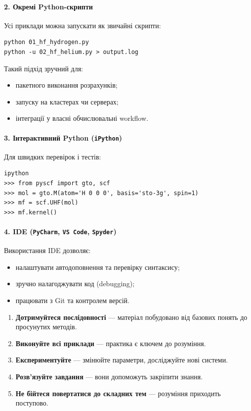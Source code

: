 \paragraph{2. Окремі Python-скрипти}

Усі приклади можна запускати як звичайні скрипти:
\begin{verbatim}
python 01_hf_hydrogen.py
python -u 02_hf_helium.py > output.log
\end{verbatim}

Такий підхід зручний для:
\begin{itemize}
    \item пакетного виконання розрахунків;
    \item запуску на кластерах чи серверах;
    \item інтеграції у власні обчислювальні workflow.
\end{itemize}

\paragraph{3. Інтерактивний Python (\texttt{iPython})}

Для швидких перевірок і тестів:
\begin{verbatim}
ipython
>>> from pyscf import gto, scf
>>> mol = gto.M(atom='H 0 0 0', basis='sto-3g', spin=1)
>>> mf = scf.UHF(mol)
>>> mf.kernel()
\end{verbatim}

\paragraph{4. IDE (\texttt{PyCharm}, \texttt{VS Code}, \texttt{Spyder})}

Використання IDE дозволяє:
\begin{itemize}
    \item налаштувати автодоповнення та перевірку синтаксису;
    \item зручно налагоджувати код (debugging);
    \item працювати з Git та контролем версій.
\end{itemize}


\begin{enumerate}
    \item \textbf{Дотримуйтеся послідовності} --- матеріал побудовано від базових понять до просунутих методів.
    \item \textbf{Виконуйте всі приклади} --- практика є ключем до розуміння.
    \item \textbf{Експериментуйте} --- змінюйте параметри, досліджуйте нові системи.
    \item \textbf{Розв’язуйте завдання} --- вони допоможуть закріпити знання.
    \item \textbf{Не бійтеся повертатися до складних тем} --- розуміння приходить поступово.
\end{enumerate}

